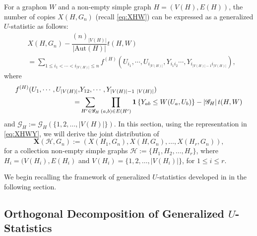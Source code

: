\documentclass[11pt,reqno]{amsart}
\numberwithin{equation}{section}
\newcommand{\one}{{\bf 1}}
\theoremstyle{definition}
\begin{document}
For a graphon $W $ and a non-empty simple graph $H= (V(H), E(H))$, the number of copies $X(H, G_n)$ (recall \eqref{eq:XHW}) can be expressed as a generalized $U$-statistic as follows:  
\begin{align}\label{eq:XHWY}
    & X(H, G_n) - \dfrac{(n)_{|V(H)|}}{|\mathrm{Aut}(H)|}t(H,W) \nonumber \\ 
    & = \sum_{1\leq i_{1}<\cdots<i_{|V(H)|}\leq n}f^{(H)}(U_{i_{1}},\cdots,  U_{i_{|V(H)|}},Y_{i_{1}i_{2}} \cdots, Y_{i_{|V(H)|-1}i_{|V(H)|}}) , 
\end{align} 
where  
\begin{align}\label{eq:def_f}
    f^{(H)}(U_{1},\cdots, U_{|V(H)|}, & Y_{12},\cdots, Y_{|V(H)|-1~ |V(H)|}) \nonumber \\ 
    = &\sum_{H'\in \mathscr{G}_{H}}\prod_{(a, b) \in E(H')}\one\left\{Y_{ab}\leq W(U_{a},U_{b})\right\} - \left|\mathscr{G}_{H}\right|t(H, W) 
\end{align} 
and $\mathscr{G}_{H} := \mathscr{G}_{H}(\{1, 2, \ldots, |V(H)|\})$. In this section, using the representation in \eqref{eq:XHWY}, we will derive the joint distribution of 
$$\bm X(\mathcal H, G_n) :=  (X(H_1, G_n), X(H, G_n), \ldots, X(H_r, G_n)) , $$
for a collection non-empty simple graphs $\mathcal H:= \{ H_1, H_2, \ldots, H_r\}$, where $H_{i}=(V(H_{i}), E(H_{i})$ and $V(H_{i})=\{1, 2, \ldots, |V(H_{i})|\}$, for $1 \leq i \leq r$. 

We begin recalling the framework of generalized $U$-statistics developed in \cite{janson1991asymptotic} in the following section.  




\subsection{Orthogonal Decomposition of Generalized $U$-Statistics}
\label{sec:generalized_U}
\end{document}
